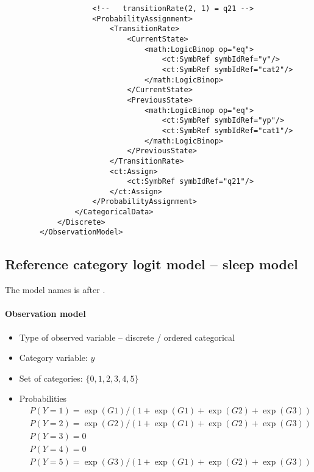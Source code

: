 \begin{lstlisting}
                    <!--   transitionRate(2, 1) = q21 -->
                    <ProbabilityAssignment>
                        <TransitionRate>
                            <CurrentState> 
                                <math:LogicBinop op="eq">
                                    <ct:SymbRef symbIdRef="y"/>
                                    <ct:SymbRef symbIdRef="cat2"/>
                                </math:LogicBinop>
                            </CurrentState>
                            <PreviousState>
                                <math:LogicBinop op="eq">
                                    <ct:SymbRef symbIdRef="yp"/>
                                    <ct:SymbRef symbIdRef="cat1"/>
                                </math:LogicBinop>
                            </PreviousState>
                        </TransitionRate>
                        <ct:Assign>
                            <ct:SymbRef symbIdRef="q21"/>
                        </ct:Assign>
                    </ProbabilityAssignment>
                </CategoricalData>
            </Discrete>
        </ObservationModel>
\end{lstlisting}



\subsection{Reference category logit model -- sleep model}
The model names is after \cite{Agresti:2002fk}.

\paragraph{Observation model}

\begin{itemize}
\item
Type of observed variable -- discrete / ordered categorical
\item
Category variable: $y$
\item
Set of categories: $\{0,1,2,3,4,5\}$
\item
Probabilities
\begin{align}
& P(Y=1) = \exp(G1)/(1+\exp(G1)+\exp(G2)+\exp(G3)) \nonumber \\
& P(Y=2) = \exp(G2)/(1+\exp(G1)+\exp(G2)+\exp(G3)) \nonumber \\
& P(Y=3) = 0 \nonumber \\
& P(Y=4) = 0 \nonumber \\
& P(Y=5) = \exp(G3)/(1+\exp(G1)+\exp(G2)+\exp(G3)) \nonumber
\end{align}
\end{itemize}


